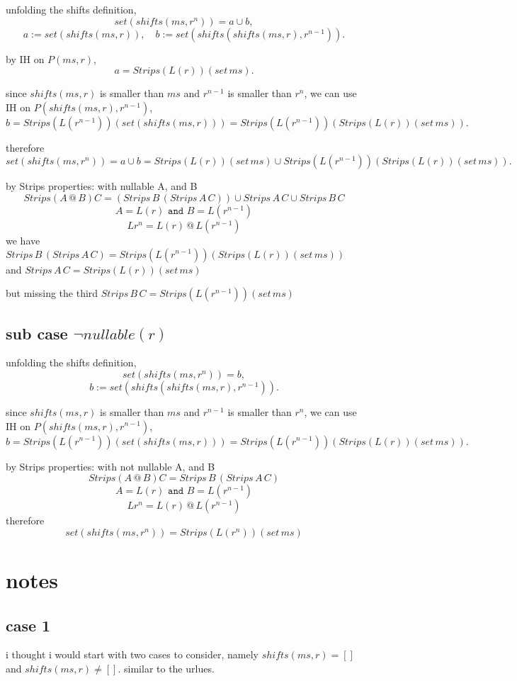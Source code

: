 \documentclass[12pt]{article}
\begin{document}
unfolding the shifts definition,
\[
set(shifts(ms,r^n)) = a \cup b,
\]
\[
a := set(shifts(ms,r)), \quad b := set(shifts(shifts(ms,r), r^{n-1})).
\]

by IH on $P(ms,r)$,
\[
a = Strips(L(r))(set\,ms).
\]

since $shifts(ms,r)$ is smaller than $ms$ and $r^{n-1}$ is smaller than $r^{n}$, we can use IH on $P(shifts(ms,r), r^{n-1})$,
\[
b = Strips(L(r^{n-1}))(set(shifts(ms,r))) = Strips(L(r^{n-1}))(Strips(L(r))(set\,ms)).
\]

therefore
\[
set(shifts(ms,r^n)) = a \cup b
= Strips(L(r))(set\,ms) \cup Strips(L(r^{n-1}))(Strips(L(r))(set\,ms)).
\]

by Strips properties:
with nullable A, and B
 \[Strips (A\,@\, B) C= (Strips\, B\, (Strips\, A\, C)) \cup Strips\, A\,C \cup Strips\, B\, C\]
\[A=L(r) \texttt{ and } B=L(r^{n-1})  \]
\[L{r^n} = L(r)\, @\, L(r^{n-1})\]
we have $Strips\, B\, (Strips\, A\, C) = Strips(L(r^{n-1}))(Strips(L(r))(set\,ms))$
and $Strips\, A\,C =Strips(L(r))(set\,ms)$

but missing the third $Strips\, B\,C =Strips(L(r^{n-1}))(set\,ms)$


\subsection{sub case $\neg nullable(r)$}

unfolding the shifts definition,
\[
set(shifts(ms,r^n)) = b,
\]
\[
b := set(shifts(shifts(ms,r), r^{n-1})).
\]

since $shifts(ms,r)$ is smaller than $ms$ and $r^{n-1}$ is smaller than $r^{n}$, we can use IH on $P(shifts(ms,r), r^{n-1})$,
\[
b = Strips(L(r^{n-1}))(set(shifts(ms,r))) = Strips(L(r^{n-1}))(Strips(L(r))(set\,ms)).
\]

by Strips properties:
with not nullable A, and B
 \[Strips (A\,@\, B) C= Strips\, B\, (Strips\, A\, C)\]
\[A=L(r) \texttt{ and } B=L(r^{n-1})  \]
\[L{r^n} = L(r)\, @\, L(r^{n-1})\]
therefore
\[ set(shifts(ms,r^n)) = Strips(L(r^n))(set\, ms)\]


\newpage
\section{notes}
\subsection{case 1}
i thought i would start with two cases to consider, namely $shifts(ms, r) = []$ 
and $shifts(ms, r) \neq []$. similar to the urlues. 
\end{document}

